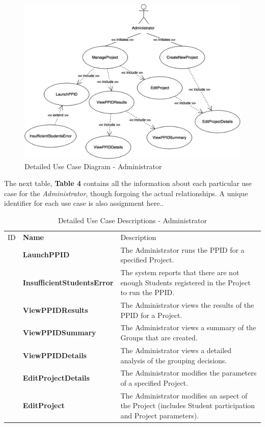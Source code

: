 \documentclass[12pt,letterpaper]{article}
\begin{document}
\begin{figure}[H]
	\centering{}
	\includegraphics[scale=0.26]{imgs/detailed-administrator-use-case-diagram.png}
	\caption{Detailed Use Case Diagram - Administrator}
\end{figure}
The next table, {\bf Table 4} contains all the information about each particular use case for the {\it Administrator}, though forgoing the actual relationships. A unique identifier for each use case is also assignment here.. %

\begin{table}[H]
	\caption{Detailed Use Case Descriptions - Administrator}
	\begin{tabu} to 
	    \tableheader{}ID & Name & Description\\
		\launchppid{} & LaunchPPID & The Administrator runs the PPID for a specified Project.\\
		\insufficientstudentserror{} & InsufficientStudentsError & The system reports that there are not enough Students registered in the Project to run the PPID.\\
		\viewppidresults{} & ViewPPIDResults & The Administrator views the results of the PPID for a Project.\\
		\viewppidsummary{} & ViewPPIDSummary & The Administrator views a summary of the Groups that are created.\\
		\viewppiddetails{} & ViewPPIDDetails & The Administrator views a detailed analysis of the grouping decisions.\\
		\editprojectdetails{} & EditProjectDetails & The Administrator modifies the parameters of a specified Project.\\
		\editproject{} & EditProject & The Administrator modifies an aspect of the Project (includes Student participation and Project parameters).\\
	\end{tabu}
\end{table}
\end{document}

